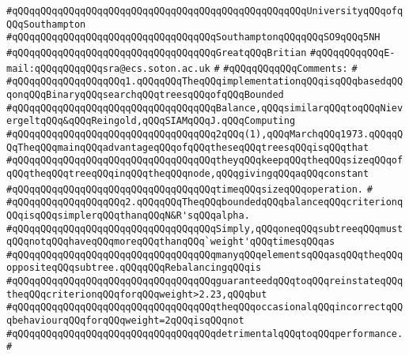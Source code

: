 \verb|#qQQqqQQqqQQqqQQqqQQqqQQqqQQqqQQqqQQqqQQqqQQqqQQqqQQqUniversityqQQqofqQQqSouthampton|\newline
\verb|#qQQqqQQqqQQqqQQqqQQqqQQqqQQqqQQqqQQqSouthamptonqQQqqQQqSO9qQQq5NH|\newline
\verb|#qQQqqQQqqQQqqQQqqQQqqQQqqQQqqQQqqQQqGreatqQQqBritian|\newline
\verb|#qQQqqQQqqQQqE-mail:qQQqqQQqqQQqsra@ecs.soton.ac.uk|\newline
\verb|#|\newline
\verb|#qQQqqQQqqQQqComments:|\newline
\verb|#|\newline
\verb|#qQQqqQQqqQQqqQQqqQQq1.qQQqqQQqTheqQQqimplementationqQQqisqQQqbasedqQQqonqQQqBinaryqQQqsearchqQQqtreesqQQqofqQQqBounded|\newline
\verb|#qQQqqQQqqQQqqQQqqQQqqQQqqQQqqQQqqQQqBalance,qQQqsimilarqQQqtoqQQqNievergeltqQQq&qQQqReingold,qQQqSIAMqQQqJ.qQQqComputing|\newline
\verb|#qQQqqQQqqQQqqQQqqQQqqQQqqQQqqQQqqQQq2qQQq(1),qQQqMarchqQQq1973.qQQqqQQqTheqQQqmainqQQqadvantageqQQqofqQQqtheseqQQqtreesqQQqisqQQqthat|\newline
\verb|#qQQqqQQqqQQqqQQqqQQqqQQqqQQqqQQqqQQqtheyqQQqkeepqQQqtheqQQqsizeqQQqofqQQqtheqQQqtreeqQQqinqQQqtheqQQqnode,qQQqgivingqQQqaqQQqconstant|\newline
\verb|#qQQqqQQqqQQqqQQqqQQqqQQqqQQqqQQqqQQqtimeqQQqsizeqQQqoperation.|\newline
\verb|#|\newline
\verb|#qQQqqQQqqQQqqQQqqQQq2.qQQqqQQqTheqQQqboundedqQQqbalanceqQQqcriterionqQQqisqQQqsimplerqQQqthanqQQqN&R'sqQQqalpha.|\newline
\verb|#qQQqqQQqqQQqqQQqqQQqqQQqqQQqqQQqqQQqSimply,qQQqoneqQQqsubtreeqQQqmustqQQqnotqQQqhaveqQQqmoreqQQqthanqQQq`weight'qQQqtimesqQQqas|\newline
\verb|#qQQqqQQqqQQqqQQqqQQqqQQqqQQqqQQqqQQqmanyqQQqelementsqQQqasqQQqtheqQQqoppositeqQQqsubtree.qQQqqQQqRebalancingqQQqis|\newline
\verb|#qQQqqQQqqQQqqQQqqQQqqQQqqQQqqQQqqQQqguaranteedqQQqtoqQQqreinstateqQQqtheqQQqcriterionqQQqforqQQqweight>2.23,qQQqbut|\newline
\verb|#qQQqqQQqqQQqqQQqqQQqqQQqqQQqqQQqqQQqtheqQQqoccasionalqQQqincorrectqQQqbehaviourqQQqforqQQqweight=2qQQqisqQQqnot|\newline
\verb|#qQQqqQQqqQQqqQQqqQQqqQQqqQQqqQQqqQQqdetrimentalqQQqtoqQQqperformance.|\newline
\verb|#|\newline
